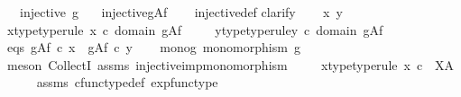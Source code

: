 \begin{isabellebody}
\ \ \ {\isachardoublequoteopen}injective\ g{\isachardoublequoteclose}\isanewline
\ \ \ {\isachardoublequoteopen}injective{\isacharparenleft}{\kern0pt}g\isactrlbsup A\isactrlesup \isactrlsub f{\isacharparenright}{\kern0pt}{\isachardoublequoteclose}\isanewline
%
\isadelimproof
\ \ %
\endisadelimproof
%
\isatagproof
{}\isamarkupfalse%
\ injective{\isacharunderscore}{\kern0pt}def\isanewline
{}\isamarkupfalse%
{\isacharparenleft}{\kern0pt}clarify{\isacharparenright}{\kern0pt}\isanewline
\ \ \isamarkupfalse%
\ x\ y\ \isanewline
\ \ \isamarkupfalse%
\ x{\isacharunderscore}{\kern0pt}type{\isacharbrackleft}{\kern0pt}type{\isacharunderscore}{\kern0pt}rule{\isacharbrackright}{\kern0pt}{\isacharcolon}{\kern0pt}\ {\isachardoublequoteopen}x\ {\isasymin}\isactrlsub c\ domain\ {\isacharparenleft}{\kern0pt}g\isactrlbsup A\isactrlesup \isactrlsub f{\isacharparenright}{\kern0pt}{\isachardoublequoteclose}\ \isanewline
\ \ \isamarkupfalse%
\ y{\isacharunderscore}{\kern0pt}type{\isacharbrackleft}{\kern0pt}type{\isacharunderscore}{\kern0pt}rule{\isacharbrackright}{\kern0pt}{\isacharcolon}{\kern0pt}{\isachardoublequoteopen}y\ {\isasymin}\isactrlsub c\ domain\ {\isacharparenleft}{\kern0pt}g\isactrlbsup A\isactrlesup \isactrlsub f{\isacharparenright}{\kern0pt}{\isachardoublequoteclose}\isanewline
\ \ \isamarkupfalse%
\ eqs{\isacharcolon}{\kern0pt}\ {\isachardoublequoteopen}g\isactrlbsup A\isactrlesup \isactrlsub f\ {\isasymcirc}\isactrlsub c\ x\ {\isacharequal}{\kern0pt}\ g\isactrlbsup A\isactrlesup \isactrlsub f\ {\isasymcirc}\isactrlsub c\ y{\isachardoublequoteclose}\isanewline
\ \ \isamarkupfalse%
\ mono{\isacharunderscore}{\kern0pt}g{\isacharcolon}{\kern0pt}\ {\isachardoublequoteopen}monomorphism\ g{\isachardoublequoteclose}\isanewline
\ \ \ \ \isamarkupfalse%
\ {\isacharparenleft}{\kern0pt}meson\ CollectI\ assms{\isacharparenleft}{\kern0pt}{}{\isacharparenright}{\kern0pt}\ injective{\isacharunderscore}{\kern0pt}imp{\isacharunderscore}{\kern0pt}monomorphism{\isacharparenright}{\kern0pt}\ \isanewline
\ \ \isamarkupfalse%
\ x{\isacharunderscore}{\kern0pt}type{\isacharprime}{\kern0pt}{\isacharbrackleft}{\kern0pt}type{\isacharunderscore}{\kern0pt}rule{\isacharbrackright}{\kern0pt}{\isacharcolon}{\kern0pt}\ {\isachardoublequoteopen}x\ {\isasymin}\isactrlsub c\ \ X\isactrlbsup A\isactrlesup {\isachardoublequoteclose}\isanewline
\ \ \ \ \isamarkupfalse%
\ assms{\isacharparenleft}{\kern0pt}{}{\isacharparenright}{\kern0pt}\ cfunc{\isacharunderscore}{\kern0pt}type{\isacharunderscore}{\kern0pt}def\ exp{\isacharunderscore}{\kern0pt}func{\isacharunderscore}{\kern0pt}type\ \isamarkupfalse%

\end{isabellebody}
